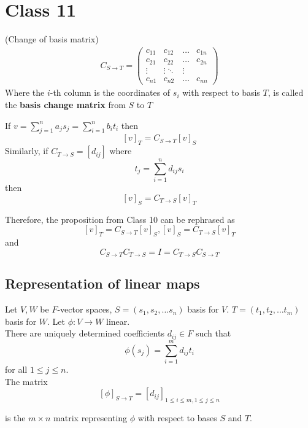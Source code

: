 \section{Class 11}

\begin{definition}
    (Change of basis matrix)
    \begin{align*}
        C_{S \to T} = \begin{pmatrix} 
        c_{11}  & c_{12} & \hdots & c_{1n} \\
        c_{21}  & c_{22} & \hdots & c_{2n} \\
        \vdots & \vdots \ddots & \vdots \\
        c_{n1} & c_{n2} & \hdots & c_{nn}
        \end{pmatrix}
    \end{align*} 
    Where the $i$-th column is the coordinates of $s_i$ with respect to basis $T$, is called the \textbf{basis change matrix} from $S$ to $T$
\end{definition}

\begin{remark}
    If $v= \sum\limits_{ j = 1}^{n} a_j s_j = \sum\limits_{i = 1}^{n}  b_i t_i$ then 
    \[
        [v]_T = C_{S \to T} [v]_S
    \]
    Similarly, if $C_{T \to S} = [d_{ij}]$  where 
    \[
        t_j = \sum\limits_{i = 1}^{n} d_{ij}s_i
    \]
    then 
    \[
        [v]_S = C_{T \to S} [v]_T
    \]

    Therefore, the proposition from Class 10 can be rephrased as 
    \[
        [v]_T = C_{S \to T} [v]_S, [v]_S = C_{ T \to S} [v]_T
    \]
    and 
    \[
        C_{S \to T} C_{T \to S} = I = C_{T \to S} C_{S \to T}
    \]
\end{remark}

\subsection{Representation of linear maps}

\begin{definition}
    Let $V, W$ be $F$-vector spaces, $S = (s_1, s_2, \hdots s_n)$ basis for $V$. $T = (t_1, t_2, \hdots t_m)$ basis for $W$. Let $\phi:V \to W$ linear. \\

    There are uniquely determined coefficients $d_{ij} \in F$ such that 
    \[
        \phi(s_j ) = \sum\limits_{i = 1}^{m} d_{ij } t_i
    \]
    for all $1 \leq j \leq n$. \\

    The matrix 
    \[
        [\phi]_{S \to T} = [d_{ij}]_{1 \leq i \leq m, 1 \leq j \leq n}
    \]

    is the $m \times n$ matrix representing $\phi$ with respect to bases $S$ and $T$.
\end{definition}

